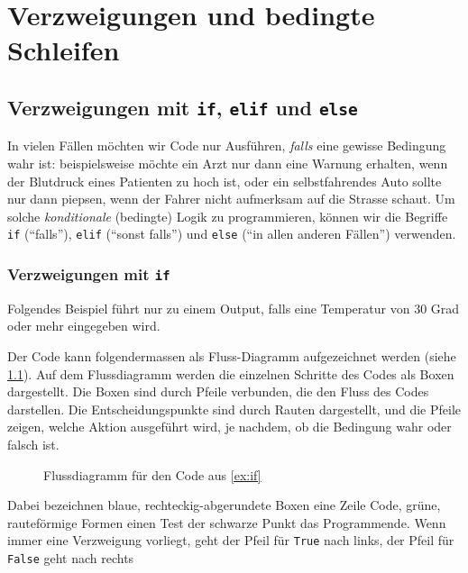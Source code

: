 
\chapter{Verzweigungen und bedingte Schleifen}\label{ch:K05_Logical_Expressions}

\section{Verzweigungen mit \texorpdfstring{\lstinline|if|}{if}, \texorpdfstring{\lstinline|elif|}{elif} und \texorpdfstring{\lstinline|else|}{else}}
In vielen Fällen möchten wir Code nur Ausführen, \textit{falls} eine gewisse Bedingung wahr ist: beispielsweise möchte ein Arzt nur dann eine Warnung erhalten, wenn der Blutdruck eines Patienten zu hoch ist, oder ein selbstfahrendes Auto sollte nur dann piepsen, wenn der Fahrer nicht aufmerksam auf die Strasse schaut. Um solche \textit{konditionale} (bedingte) Logik zu programmieren, können wir die Begriffe \lstinline|if| (\enquote{falls}), \lstinline|elif| (\enquote{sonst falls}) und \lstinline|else| (\enquote{in allen anderen Fällen}) verwenden.

\subsection{Verzweigungen mit \texorpdfstring{\lstinline|if|}{if}}

\begin{myexample}\label{ex:if}
Folgendes Beispiel führt nur zu einem Output, falls eine Temperatur von 30 Grad oder mehr eingegeben wird.


Der Code kann folgendermassen als Fluss-Diagramm aufgezeichnet werden (siehe \cref{fig:if-flussdiagramm}).
Auf dem Flussdiagramm werden die einzelnen Schritte des Codes als Boxen dargestellt. Die Boxen sind durch Pfeile verbunden, die den Fluss des Codes darstellen. Die Entscheidungspunkte sind durch Rauten dargestellt, und die Pfeile zeigen, welche Aktion ausgeführt wird, je nachdem, ob die Bedingung wahr oder falsch ist.

\begin{figure}[H]
	\centering
	
	\caption{Flussdiagramm für den Code aus \cref{ex:if}}
	\label{fig:if-flussdiagramm}
\end{figure}
Dabei bezeichnen blaue, rechteckig-abgerundete Boxen eine Zeile Code, grüne, rauteförmige Formen einen Test der schwarze Punkt das Programmende. Wenn immer eine Verzweigung vorliegt, geht der Pfeil für \lstinline|True| nach links, der Pfeil für \lstinline|False| geht nach rechts
\end{myexample}

